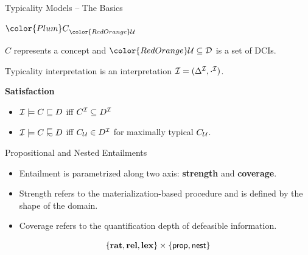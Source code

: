 \documentclass[10pt, xcolor=dvipsnames]{beamer}
\begin{document}
\begin{frame}{Typicality Models -- The Basics}
  \begin{center}
    \Large{
      $\typel{\color{Plum}C}{\color{RedOrange}\Umc}$
    }
  \end{center}

  {\color{Plum}$C$} represents a concept and ${\color{RedOrange}\Umc} \subseteq \Dmc$ is a set of DCIs.

  Typicality interpretation is an interpretation $\mathcal{I} = (\Delta^{\mathcal{I}}, \cdot^{\mathcal{I}})$.

  \medskip \pause

  \textbf{Satisfaction}

  \begin{itemize}
    \item $\mathcal{I} \models C \sqsubseteq D$ iff $C^{\mathcal{I}} \subseteq D^{\mathcal{I}}$
    \item $\Imc \models C \definc D$ iff ${C}_{\mathcal{U}} \in D^{\mathcal{I}}$ for maximally typical ${C}_{\mathcal{U}}$.
  \end{itemize}


\end{frame}

\begin{frame}{Propositional and Nested Entailments}
\large 
\begin{itemize}
  \item Entailment is parametrized along two axis: \textbf{strength} and \textbf{coverage}.
  \item Strength refers to the materialization-based procedure and is defined by the shape of the domain.
  \item Coverage refers to the quantification depth of defeasible information.
\end{itemize}
$$\{\mathbf{rat}, \mathbf{rel}, \mathbf{lex}\} \times \{\mathsf{prop}, \mathsf{nest}\}$$
\end{frame}
\end{document}
